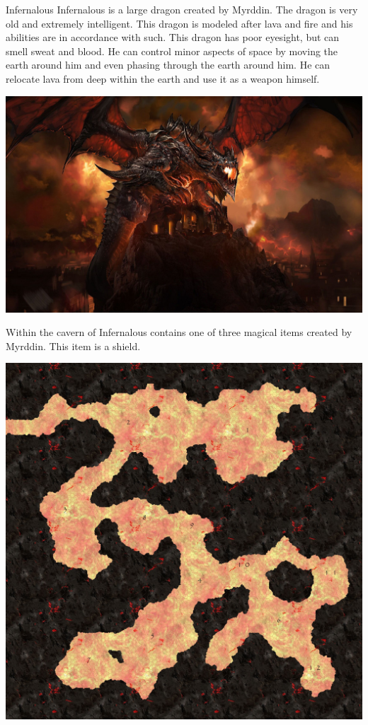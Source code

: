 \begin{commentbox}{Infernalous}
	Infernalous is a large dragon created by Myrddin. The dragon is very old and extremely intelligent. This dragon is modeled after lava and fire and his abilities are in accordance with such. This dragon has poor eyesight, but can smell sweat and blood. He can control minor aspects of space by moving the earth around him and even phasing through the earth around him. He can relocate lava from deep within the earth and use it as a weapon himself.
	
	\begin{center}
	\includegraphics[width=0.8\linewidth]{img/deathwing.jpg}
	\end{center}

	Within the cavern of Infernalous contains one of three magical items created by Myrddin. This item is a shield.

	\begin{center}
	\includegraphics[width=0.8\linewidth]{img/infernalous.jpg}
	\end{center}
\end{commentbox}


